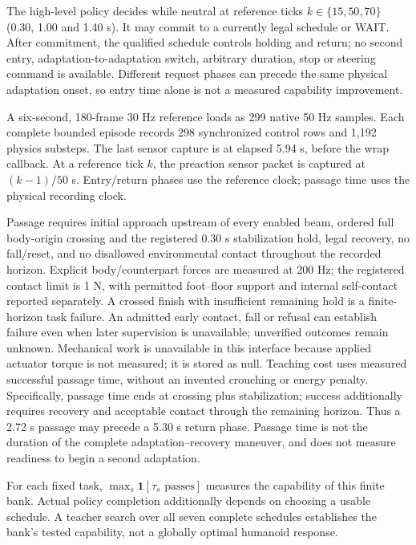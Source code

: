 \documentclass[10pt]{article}
\begin{document}
The high-level policy decides while neutral at reference ticks $k\in\{15,50,70\}$
(0.30, 1.00 and 1.40 s). It may commit to a currently legal schedule or WAIT.
After commitment, the qualified schedule controls holding and return; no second
entry, adaptation-to-adaptation switch, arbitrary duration, stop or steering
command is available. Different request phases can precede the same physical
adaptation onset, so entry time alone is not a measured capability improvement.

A six-second, 180-frame 30 Hz reference loads as 299 native 50 Hz samples. Each
complete bounded episode records 298 synchronized control rows and 1,192 physics substeps.
The last sensor capture is at elapsed 5.94 s, before the wrap callback. At a
reference tick $k$, the preaction sensor packet is captured at $(k-1)/50$ s.
Entry/return phases use the reference clock; passage time uses the physical
recording clock.

Passage requires initial approach upstream of every enabled beam, ordered full
body-origin crossing and the registered 0.30 s stabilization hold, legal recovery,
no fall/reset, and no disallowed environmental contact throughout the recorded
horizon. Explicit body/counterpart forces are measured at 200 Hz; the registered
contact limit is 1 N, with permitted foot--floor support and internal self-contact
reported separately. A crossed finish with insufficient remaining hold is a
finite-horizon task failure. An admitted early contact, fall or refusal can
establish failure even when later supervision is unavailable; unverified outcomes
remain unknown. Mechanical work is unavailable
in this interface because applied actuator torque is not measured; it is stored
as null. Teaching cost uses measured successful passage time, without an invented
crouching or energy penalty. Specifically, passage time ends at crossing plus
stabilization; success additionally requires recovery and acceptable contact
through the remaining horizon. Thus a 2.72 s passage may precede a 5.30 s return
phase. Passage time is not the duration of the complete adaptation--recovery
maneuver, and does not measure readiness to begin a second adaptation.

For each fixed task, $\max_s\mathbf1[\tau_s\text{ passes}]$ measures the capability
of this finite bank. Actual policy completion additionally depends on choosing a
usable schedule. A teacher search over all seven complete schedules establishes
the bank's tested capability, not a globally optimal humanoid response.
\end{document}
